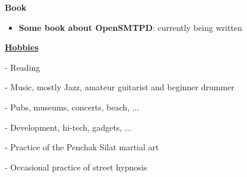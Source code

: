 \documentclass[a4paper,10pt]{letter}
\begin{document}
\textbf{Book}
\begin{itemize}
\item	\textbf{Some book about OpenSMTPD}: currently being written\\
\end{itemize}


\underline{\textbf{Hobbies}}\\
\begin{description}
\item - Reading
\item - Music, mostly Jazz, amateur guitarist and beginner drummer
\item - Pubs, museums, concerts, beach, ...
\item - Development, hi-tech, gadgets, ...
\item - Practice of the Penchak Silat martial art
\item - Occasional practice of street hypnosis\\
\end{description}
\end{document}
